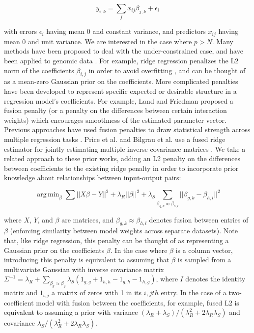 \documentclass[11pt]{article}
\DeclareMathOperator*{\argmin}{arg\,min}
\begin{document}
\begin{equation}
y_{i,k} = \displaystyle\sum_{j}x_{ij}\beta_{j,k} + \epsilon_i
\end{equation}

with errors $\epsilon_i$ having mean 0 and constant variance, and predictors $x_{ij}$ having mean 0 and unit variance. We are interested in the case where $p > N$. Many methods have been proposed to deal with the under-constrained case, and have been applied to genomic data \cite{waldron_optimized_2011, li_network-constrained_2008}. For example, ridge regression penalizes the L2 norm of the coefficients $\beta_{i,j}$ in order to avoid overfitting \cite{hoerl_ridge_1970}, and can be thought of as a mean-zero Gaussian prior on the coefficients. 
More complicated penalties have been developed to represent specific expected or desirable structure in a regression model's coefficients. 
For example, Land and Friedman \cite{citeulike3780356} proposed a fusion penalty (or a penalty on the differences between certain interaction weights) which encourages smoothness of the estimated parameter vector. Previous approaches have used  fusion penalties to draw statistical strength across multiple regression tasks \cite{kim_tree-guided_2012,Land1997,Chen2010,Petry2011,Hebiri2011}. 
Price et al. and Bilgrau et al. use a fused ridge estimator for jointly estimating multiple inverse covariance matrices \cite{Price2014a,Bilgrau2015}.
We take a related approach to these prior works, adding an L2 penalty on the differences between coefficients to the existing ridge penalty in order to incorporate prior knowledge about relationships between input-output pairs:

\begin{equation}
\argmin_{\beta} \displaystyle\sum \vert \vert X\beta - Y \vert \vert ^2 + \lambda_R \vert \vert \beta \vert \vert ^2 +  \lambda_S  \displaystyle \sum_{\beta_{g,k} \approx \beta_{h,l}} || \beta_{g,k} - \beta_{h,l} ||^2
\label{eqn:main}
\end{equation}

where $X$, $Y$, and $\beta$ are matrices, and $\beta_{g,k} \approx \beta_{h,l}$ denotes fusion between entries of $\beta$ (enforcing similarity between model weights across separate datasets). 
Note that, like ridge regression, this penalty can be thought of as representing a Gaussian prior on the coefficients $\beta$. 
In the case where $\beta$ is a column vector, introducing this penalty is equivalent to assuming that $\beta$ is sampled from a multivariate Gaussian with inverse covariance matrix $\Sigma^{-1} = \lambda_R + \displaystyle \sum_{\beta_g \approx \beta_g} \lambda_S (1_{g,g} + 1_{h,h} - 1_{g,h} - 1_{h,g})$, where $I$ denotes the identity matrix and $1_{i,j}$ a matrix of zeros with 1 in its $i, jth$ entry. 
In the case of a two-coefficient model with fusion between the coefficients, for example, fused L2 is equivalent to assuming a prior with variance $(\lambda_R + \lambda_S)/(\lambda_R^2+2\lambda_R\lambda_S)$ and covariance $\lambda_S/(\lambda_R^2+2\lambda_R\lambda_S)$.
\end{document}
